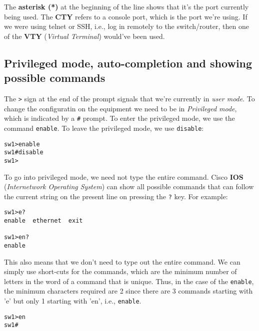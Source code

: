 \noindent
The \textbf{asterisk (*)} at the beginning of the line shows that it's the port currently being used. The \textbf{CTY} refers to a console port, which is the port we're using. If we were using telnet or SSH, i.e., log in remotely to the switch/router, then one of the \textbf{VTY} (\textit{Virtual Terminal}) would've been used. 

\subsection{Privileged mode, auto-completion and showing possible commands}
The \verb|>| sign at the end of the prompt signals that we're currently in \textit{user mode}. To change the configuratin on the equipment we need to be in \textit{Privileged mode}, which is indicated by a \verb|#| prompt. To enter the privileged mode, we use the command \verb|enable|. To leave the privileged mode, we use \verb|disable|:

\vspace{-15pt}
\begin{verbatim}
sw1>enable
sw1#disable
sw1>
\end{verbatim}
\vspace{-10pt}

\noindent
To go into privileged mode, we need not type the entire command. Cisco \textbf{IOS} (\textit{Internetwork Operating System}) can show all possible commands that can follow the current string on the present line on pressing the \verb|?| key. For example: 

\vspace{-15pt}
\begin{verbatim}
sw1>e?
enable  ethernet  exit

sw1>en?
enable
\end{verbatim}
\vspace{-10pt}

\noindent
This also means that we don't need to type out the entire command. We can simply use short-cuts for the commands, which are the minimum number of letters in the word of a command that is unique. Thus, in the case of the \verb|enable|, the minimum characters required are 2 since there are 3 commands starting with 'e' but only 1 starting with 'en', i.e., \verb|enable|. 

\vspace{-15pt}
\begin{verbatim}
sw1>en
sw1#
\end{verbatim}
\vspace{-10pt}

